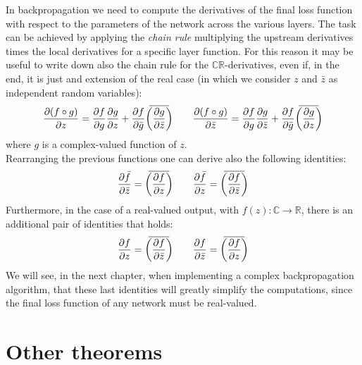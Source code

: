 \documentclass[../main.tex]{subfiles}
\begin{document}
In backpropagation we need to compute the derivatives of the final loss function with respect to the parameters of the network across the various layers. The task can be achieved by applying the \textit{chain rule} multiplying the upstream derivatives times the local derivatives for a specific layer function. For this reason it may be useful to write down also the chain rule for the $\mathds{C}\mathds{R}$-derivatives, even if, in the end, it is just and extension of the real case (in which we consider $z$ and $\bar{z}$ as independent random variables):
\begin{equation}
\pdv{(f\circ g)}{z} = \pdv{f}{g}\pdv{g}{z} + \pdv{f}{\bar{g}}\overbar{\left(\pdv{g}{\bar{z}}\right)} \qquad \pdv{(f\circ g)}{\bar{z}} = \pdv{f}{g}\pdv{g}{\bar{z}} + \pdv{f}{\bar{g}}\overbar{\left(\pdv{g}{z}\right)}
\label{eq:CR_derivs_chain_rule}
\end{equation}
where $g$ is a complex-valued function of $z$.\\
Rearranging the previous functions one can derive also the following identities:
\begin{equation}
\pdv{\bar{f}}{\bar{z}} = \overbar{\left(\pdv{f}{z}\right)} \qquad \pdv{\bar{f}}{z} = \overbar{\left(\pdv{f}{\bar{z}}\right)}
\label{eq:CR_calc_identities_1}
\end{equation}
Furthermore, in the case of a real-valued output, with $f(z):\mathds{C}\to\mathds{R}$, there is an additional pair of identities that holds:
\begin{equation}
\pdv{f}{z} = \overbar{\left(\pdv{f}{\bar{z}}\right)} \qquad \pdv{f}{\bar{z}} = \overbar{\left(\pdv{f}{z}\right)}
\label{eq:CR_calc_identities_2}
\end{equation}
We will see, in the next chapter, when implementing a complex backpropagation algorithm, that these last identities will greatly simplify the computations, since the final loss function of any network must be real-valued.


\section{Other theorems}
\end{document}
